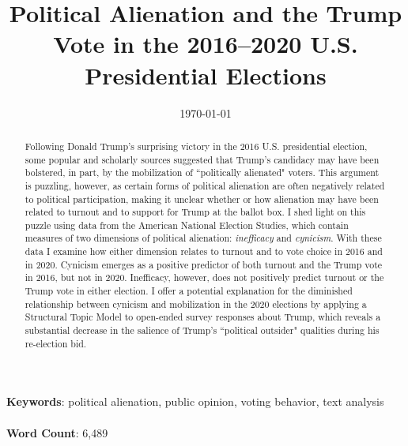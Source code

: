 \documentclass[12pt]{article}
\title{Political Alienation and the Trump Vote in the 2016--2020 U.S. Presidential Elections}
\author{}
\date{\today}
\begin{document}
\maketitle
\thispagestyle{empty}




\begin{abstract}  
 Following Donald Trump's surprising victory in the 2016 U.S. presidential election, some popular and scholarly sources suggested that Trump's candidacy may have been bolstered, in part, by the mobilization of ``politically alienated" voters. This argument is puzzling, however, as certain forms of political alienation are often negatively related to political participation, making it unclear whether or how alienation may have been related to turnout and to support for Trump at the ballot box. I shed light on this puzzle using data from the American National Election Studies, which contain measures of two dimensions of political alienation: \textit{inefficacy} and \textit{cynicism}. With these data I examine how either dimension relates to turnout and to vote choice in 2016 and in 2020. Cynicism emerges as a positive predictor of both turnout and the Trump vote in 2016, but not in 2020. Inefficacy, however, does not positively predict turnout or the Trump vote in either election. I offer a potential explanation for the diminished relationship between cynicism and mobilization in the 2020 elections by applying a Structural Topic Model to open-ended survey responses about Trump, which reveals a substantial decrease in the salience of Trump's ``political outsider" qualities during his re-election bid. 
\end{abstract}
\vspace{1.5cm}
\textbf{Keywords}: political alienation, public opinion, voting behavior, text analysis \\ \\
\textbf{Word Count}: 6,489 \\


\clearpage
{}



\doublespacing






\end{document}
